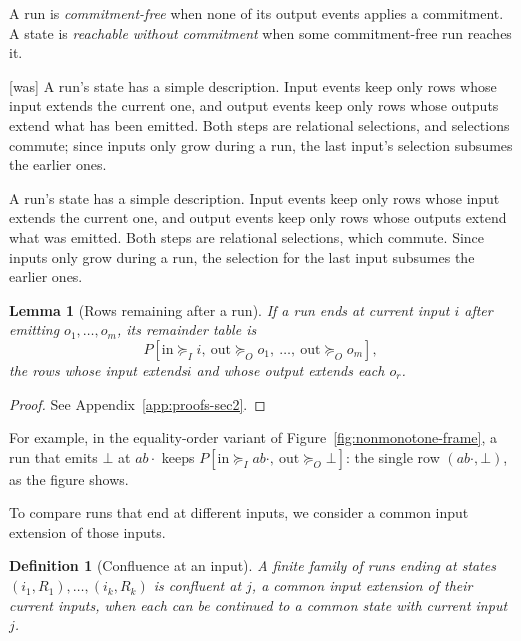 \documentclass[sigconf]{cidr-2027}
\newtheorem{lemma}{Lemma}
\newtheorem{definition}{Definition}
\theoremstyle{remark}
\newcommand{\InputGe}{\succeq_I}
\newcommand{\OutputGe}{\succeq_O}
\newcommand{\commitment}{commitment\xspace}
\newcommand{\inrel}{extends\xspace}          %
\newcommand{\ingrow}{grow\xspace}            %
\newcommand{\indesc}{input extension\xspace} %
\newcommand{\outrel}{extends\xspace}          %
\newcommand{\outrelbase}{extend\xspace}       %
\begin{document}
A run is \emph{\commitment-free} when none of its output events applies a
\commitment.  A state is \emph{reachable without \commitment} when
some \commitment-free run reaches it.



{\footnotesize\color{black!50}\noindent\textsf{[was]} A run's state has a simple description.  Input events keep only rows whose
input \inrel the current one, and output events keep only rows whose outputs
\outrelbase what has been emitted.  Both steps are relational selections, and selections commute; since inputs only \ingrow during a run, the last input's selection
subsumes the earlier ones.\par}

\color{blue!70!black}A run's state has a simple description.  Input events keep only rows whose
input \inrel the current one, and output events keep only rows whose outputs
\outrelbase what was emitted.  Both steps are relational selections, which
commute.  Since inputs only \ingrow during a run, the selection for the last
input subsumes the earlier ones.\color{black}

\begin{lemma}[Rows remaining after a run]
\label{lem:run-residual}
If a run ends at current input $i$ after emitting
$o_1,\ldots,o_m$, its remainder table is
\begin{equation}
  P[\mathrm{in}\InputGe i,\ \mathrm{out}\OutputGe o_1,\ \ldots,\
    \mathrm{out}\OutputGe o_m],
  \label{eq:run-residual}
\end{equation}
the rows whose input \inrel $i$ and whose output \outrel each $o_r$.
\end{lemma}

\begin{proof}
See Appendix~\ref{app:proofs-sec2}.
\end{proof}

For example, in the equality-order variant of
Figure~\ref{fig:nonmonotone-frame}, a run that emits $\bot$ at $ab\cdot$ keeps
$P[\mathrm{in}\InputGe ab\cdot,\ \mathrm{out}\OutputGe\bot]$: the single row
$(ab\cdot,\bot)$, as the figure shows.

To compare runs that end at different inputs, we consider a common \indesc
of those inputs.

\begin{definition}[Confluence at an input]
\label{def:confluence}
A finite family of runs ending at states $(i_1,R_1),\ldots,(i_k,R_k)$ is \emph{confluent at} $j$, a common \indesc of their current inputs, when each can be continued to a common state with current input $j$.
\end{definition}
\end{document}
